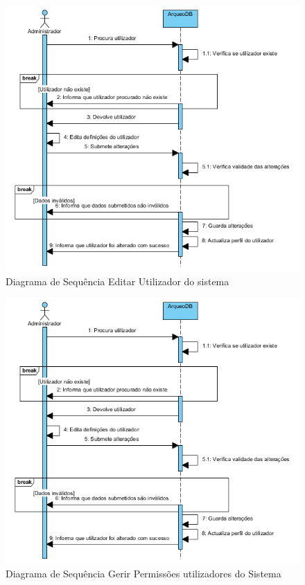 \documentclass[12pt,a4paper]{article}
\begin{document}
\begin{figure}[h!]
\centering
\includegraphics[scale=1]{sequencia/A_editarutilizador}
\caption{Diagrama de Sequência Editar Utilizador do sistema} 
\end{figure}  

\begin{figure}[h!]
\centering
\includegraphics[scale=1]{sequencia/A_editarutilizador}
\caption{Diagrama de Sequência Gerir Permissões utilizadores do Sistema} 
\end{figure}   
  
\end{document}
